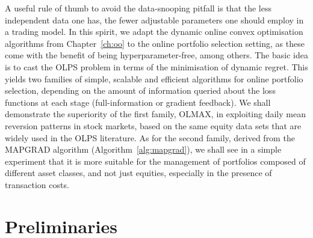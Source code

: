 \begin{mccorrection}
A useful rule of thumb to avoid the data-snooping pitfall is that the less independent data one has, the fewer adjustable parameters one should employ in a trading model. In this spirit, we adapt the dynamic online convex optimisation algorithms from Chapter~\ref{ch:oo} to the online portfolio selection setting, as these come with the benefit of being hyperparameter-free, among others. The basic idea is to cast the OLPS problem in terms of the minimisation of dynamic regret. This yields two families of simple, scalable and efficient algorithms for online portfolio selection, depending on the amount of information queried about the loss functions at each stage (full-information or gradient feedback). We shall demonstrate the superiority of the first family, OLMAX, in exploiting daily mean reversion patterns in stock markets, based on the same equity data sets that are widely used in the OLPS literature. As for the second family, derived from the MAPGRAD algorithm (Algorithm~\ref{alg:mapgrad}), we shall see in a simple experiment that it is more suitable for the management of portfolios composed of different asset classes, and not just equities, especially in the presence of transaction costs.
\end{mccorrection}


\section{Preliminaries}

